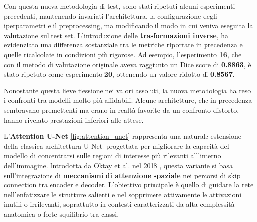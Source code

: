 
Con questa nuova metodologia di test, sono stati ripetuti alcuni esperimenti precedenti, mantenendo invariati l’architettura, la configurazione degli iperparametri e il preprocessing, ma modificando il modo in cui veniva eseguita la valutazione sul test set. L’introduzione delle \textbf{trasformazioni inverse}, ha evidenziato una differenza sostanziale tra le metriche riportate in precedenza e quelle ricalcolate in condizioni più rigorose. Ad esempio, l’esperimento \textbf{16}, che con il metodo di valutazione originale aveva raggiunto un Dice score di \textbf{0.8863}, è stato ripetuto come esperimento \textbf{20}, ottenendo un valore ridotto di \textbf{0.8567}. 

Nonostante questa lieve flessione nei valori assoluti, la nuova metodologia ha reso i confronti tra modelli molto più affidabili. Alcune architetture, che in precedenza sembravano promettenti ma erano in realtà favorite da un confronto distorto, hanno rivelato prestazioni inferiori alle attese. %


L’\textbf{Attention U-Net} \ref{fig:attention_unet} rappresenta una naturale estensione della classica architettura U-Net, progettata per migliorare la capacità del modello di concentrarsi sulle regioni di interesse più rilevanti all’interno dell’immagine. Introdotta da Oktay et al. nel 2018 \cite{oktay2018attention}, questa variante si basa sull’integrazione di \textbf{meccanismi di attenzione spaziale} nei percorsi di skip connection tra encoder e decoder. L’obiettivo principale è quello di guidare la rete nell’enfatizzare le strutture salienti e nel sopprimere attivamente le attivazioni inutili o irrilevanti, soprattutto in contesti caratterizzati da alta complessità anatomica o forte squilibrio tra classi.

